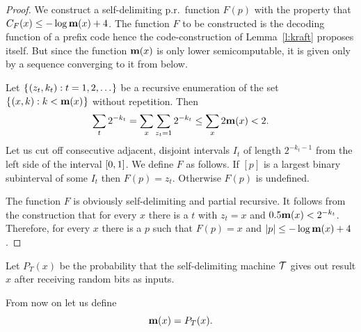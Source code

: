 \begin{proof}
  \leanok
 We construct a self-delimiting p.r.~function \( F(p) \) with the
property that \( C_{F}(x) \le -\log\mathbf{m}(x) + 4 \). The function \( F \) to be 
constructed is the decoding function of a prefix code hence the 
code-construction of Lemma~\ref{l:kraft} proposes itself. 
But since
the function \( \mathbf{m}(x) \) is only lower semicomputable, it is given only by a
sequence converging to it from below. 

Let \( \mathopen\{\mskip 1mu \mathopen(z_{t},k_{t}\mathclose) : t=1,2,\ldots \mskip 1mu\mathclose\} \) be a recursive enumeration
of the set \( \mathopen\{\mskip 1mu \mathopen(x,k\mathclose) : k < \mathbf{m}(x) \mskip 1mu\mathclose\} \) without repetition. Then 
 \[ 
  \sum_{t} 2^{-k_{t}} = \sum_{x} \sum_{z_{t}=1} 2^{-k_{t}} \le \sum_{x} 2\mathbf{m}(x) < 2.
 \]
  Let us cut off consecutive adjacent, disjoint intervals \( I_{t} \) of
length \( 2^{-k_{t}-1} \) from the left side of the interval \( [0,1] \). 
We define \( F \) as follows. If \( [p] \) is a largest binary subinterval of
some \( I_{t} \) then \( F(p)=z_{t} \). Otherwise \( F(p) \) is undefined. 

The function \( F \) is obviously self-delimiting and partial recursive. It 
follows from the construction that for every \( x \) there is a \( t \) with 
\( z_{t}=x \) and \( 0.5\mathbf{m}(x) < 2^{-k_{t}} \). Therefore, for every \( x \) 
there is a \( p \) such that \( F(p)=x \) and \( |p| \le -\log\mathbf{m}(x) + 4 \). 
 \end{proof}

\begin{definition}
  \label{def:PT}
  \leanok
Let \( P_{T}(x) \) be the probability that the self-delimiting
machine \( \mathcal{T} \) gives out result \( x \) after receiving random bits as inputs.
\end{definition}

 \begin{definition}
  \label{def:m-is-PT}
  \leanok
  From now on let us define
 \setcounter{equation}{13}%
 \begin{equation}\label{eq:m(x)}
   \mathbf{m}(x) = P_{T}(x).
 \end{equation}
 \end{definition}



